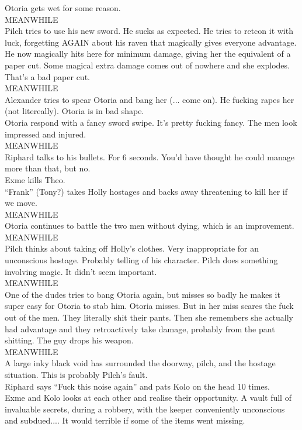 Otoria gets wet for some reason.\\
MEANWHILE\\
Pilch tries to use his new sword. He sucks as expected. He tries to retcon it with luck, forgetting AGAIN about his raven that magically gives everyone advantage. He now magically hits here for minimum damage, giving her the equivalent of a paper cut. Some magical extra damage comes out of nowhere and she explodes. That’s a bad paper cut.\\
MEANWHILE\\
Alexander tries to spear Otoria and bang her (... come on). He fucking rapes her (not litereally). Otoria is in bad shape.\\
Otoria respond with a fancy sword swipe. It’s pretty fucking fancy. The men look impressed and injured.\\
MEANWHILE\\
Riphard talks to his bullets. For 6 seconds. You’d have thought he could manage more than that, but no.\\
Exme kills Theo.\\
“Frank” (Tony?) takes Holly hostages and backs away threatening to kill her if we move.\\
MEANWHILE\\
Otoria continues to battle the two men without dying, which is an improvement.\\
MEANWHILE\\
Pilch thinks about taking off Holly’s clothes. Very inappropriate for an unconscious hostage. Probably telling of his character. Pilch does something involving magic. It didn’t seem important.\\
MEANWHILE\\
One of the dudes tries to bang Otoria again, but misses so badly he makes it super easy for Otoria to stab him. Otoria misses. But in her miss scares the fuck out of the men. They literally shit their pants. Then she remembers she actually had advantage and they retroactively take damage, probably from the pant shitting. The guy drops his weapon.\\
MEANWHILE\\
A large inky black void has surrounded the doorway, pilch, and the hostage situation. This is probably Pilch’s fault.\\
Riphard says “Fuck this noise again” and pats Kolo on the head 10 times.\\
Exme and Kolo looks at each other and realise their opportunity. A vault full of invaluable secrets, during a robbery, with the keeper conveniently unconscious and subdued.... It would terrible if some of the items went missing.\\
